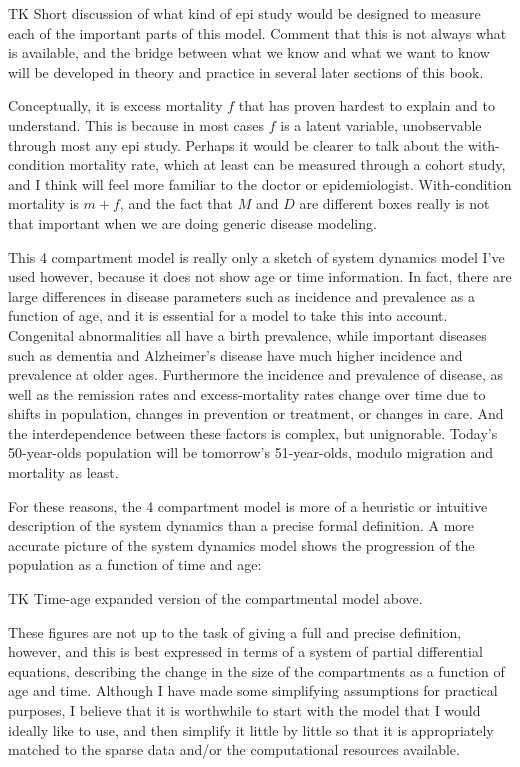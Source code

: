 TK Short discussion of what kind of epi study would be designed to
measure each of the important parts of this model. Comment that this
is not always what is available, and the bridge between what we know
and what we want to know will be developed in theory and practice in
several later sections of this book.

Conceptually, it is excess mortality $f$ that has proven hardest to
explain and to understand. This is because in most cases $f$ is a
latent variable, unobservable through most any epi study. Perhaps it
would be clearer to talk about the with-condition mortality rate,
which at least can be measured through a cohort study, and I think
will feel more familiar to the doctor or
epidemiologist. With-condition mortality is $m+f$, and the fact that
$M$ and $D$ are different boxes really is not that important when we
are doing generic disease modeling.

This 4 compartment model is really only a sketch of system dynamics
model I've used however, because it does not show age or time
information. In fact, there are large differences in disease
parameters such as incidence and prevalence as a function of age, and
it is essential for a model to take this into account.  Congenital
abnormalities all have a birth prevalence, while important diseases
such as dementia and Alzheimer's disease have much higher incidence
and prevalence at older ages. Furthermore the incidence and prevalence
of disease, as well as the remission rates and excess-mortality rates
change over time due to shifts in population, changes in prevention or
treatment, or changes in care. And the interdependence between these
factors is complex, but unignorable.  Today's 50-year-olds population
will be tomorrow's 51-year-olds, modulo migration and mortality as
least.

For these reasons, the 4 compartment model is more of a heuristic or
intuitive description of the system dynamics than a precise formal
definition.  A more accurate picture of the system dynamics model
shows the progression of the population as a function of time and age:

TK Time-age expanded version of the compartmental model above.

These figures are not up to the task of giving a full and precise
definition, however, and this is best expressed in terms of a system
of partial differential equations, describing the change in the size
of the compartments as a function of age and time. Although I have
made some simplifying assumptions for practical purposes, I believe
that it is worthwhile to start with the model that I would ideally
like to use, and then simplify it little by little so that it is
appropriately matched to the sparse data and/or the computational
resources available.


